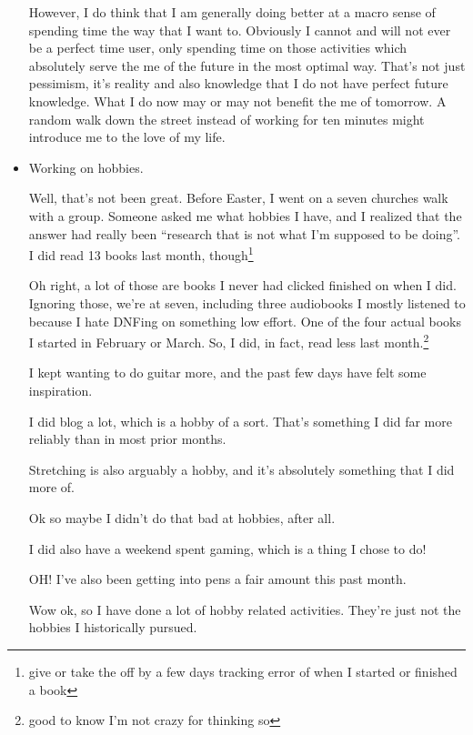 \documentclass[12pt]{article}
\newcommand{\say}[1]{``#1''}
\renewcommand{\,}{\textsuperscript{,}}
\begin{document}
\begin{itemize}
However, I do think that I am generally doing better at a macro sense of spending time the way that I want to.  
Obviously I cannot and will not ever be a perfect time user, only spending time on those activities which absolutely serve the me of the future in the most optimal way.  
That's not just pessimism, it's reality and also knowledge that I do not have perfect future knowledge.  
What I do now may or may not benefit the me of tomorrow.  
A random walk down the street instead of working for ten minutes might introduce me to the love of my life.

\item Working on hobbies.

Well, that's not been great.  
Before Easter, I went on a seven churches walk with a group.  
Someone asked me what hobbies I have, and I realized that the answer had really been \say{research that is not what I'm supposed to be doing}.  
I did read 13 books last month, though\footnote{give or take the off by a few days tracking error of when I started or finished a book}

Oh right, a lot of those are books I never had clicked finished on when I did.  
Ignoring those, we're at seven, including three audiobooks I mostly listened to because I hate DNFing on something low effort.  
One of the four actual books I started in February or March.  
So, I did, in fact, read less last month.\footnote{good to know I'm not crazy for thinking so}

I kept wanting to do guitar more, and the past few days have felt some inspiration.

I did blog a lot, which is a hobby of a sort.  
That's something I did far more reliably than in most prior months.

Stretching is also arguably a hobby, and it's absolutely something that I did more of.

Ok so maybe I didn't do that bad at hobbies, after all.

I did also have a weekend spent gaming, which is a thing I chose to do!

OH!   
I've also been getting into pens a fair amount this past month.

Wow ok, so I have done a lot of hobby related activities.  
They're just not the hobbies I historically pursued.

\end{itemize}
\end{document}
